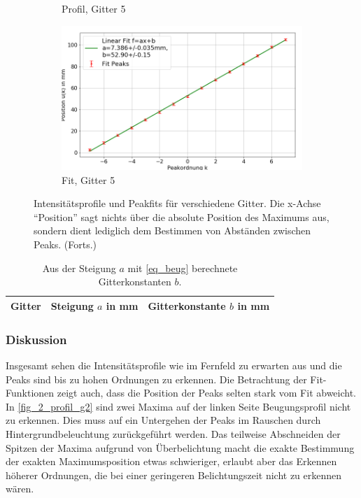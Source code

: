 \documentclass[
	a4paper,
	12pt,
	pagesize,
	ngerman
]{scrartcl}
\begin{document}
\begin{figure}[H]
\begin{subfigure}[b]{0.475\textwidth}
            \caption%
            {Profil, Gitter 5}
            \label{fig_2_profil_g5}
        \end{subfigure}
        \hfill
        \begin{subfigure}[b]{0.475\textwidth}
            \centering
            \includegraphics[width=\textwidth]{img/2/2_gitter_g5_fit}
            \caption[]%
            {Fit, Gitter 5}
            \label{fig_2_fit_g5}
        \end{subfigure}
        \caption%
        {
				Intensitätsprofile und Peakfits für verschiedene Gitter.
				Die x-Achse \enquote{Position} sagt nichts über die absolute Position des Maximums aus, sondern dient lediglich dem Bestimmen von Abständen zwischen Peaks. (Forts.)
				}
        \label{fig_2_mix_2}
    \end{figure}

\begin{table}[H]
		\centering
		\begin{tabular}{ c | c | c }
			 Gitter & Steigung $a$ in \si{mm} & Gitterkonstante $b$ in \si{mm} \\ \hline
			 
		\end{tabular}
		\caption{
		Aus der Steigung $a$ mit \cref{eq_beug} berechnete Gitterkonstanten $b$.
		}
		\label{tb_2_beug}
\end{table}
	\subsubsection*{Diskussion}
	Insgesamt sehen die Intensitätsprofile wie im Fernfeld zu erwarten aus und die Peaks sind bis zu hohen Ordnungen zu erkennen.
	Die Betrachtung der Fit-Funktionen zeigt auch, dass die Position der Peaks selten stark vom Fit abweicht.
	In \cref{fig_2_profil_g2} sind zwei Maxima auf der linken Seite Beugungsprofil nicht zu erkennen.
	Dies muss auf ein Untergehen der Peaks im Rauschen durch Hintergrundbeleuchtung zurückgeführt werden.
	Das teilweise Abschneiden der Spitzen der Maxima aufgrund von Überbelichtung macht die exakte Bestimmung der exakten Maximumsposition etwas schwieriger, erlaubt aber das Erkennen höherer Ordnungen, die bei einer geringeren Belichtungszeit nicht zu erkennen wären.
\end{document}
